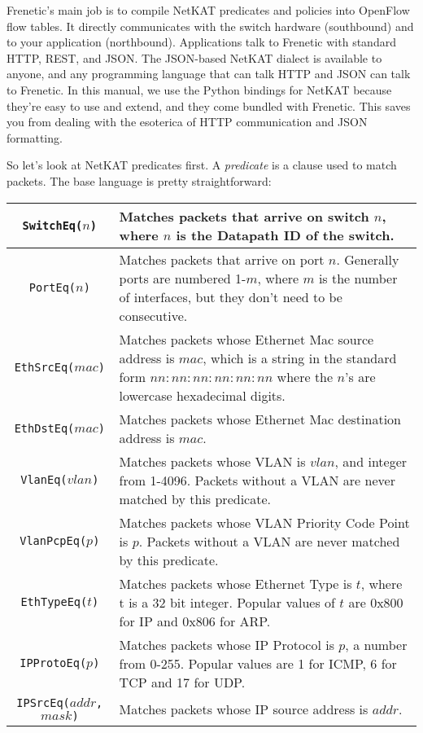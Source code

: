 Frenetic's main job is to compile NetKAT predicates and policies into OpenFlow flow tables.  
It directly communicates with the switch hardware (southbound) and to your application (northbound).
Applications talk to Frenetic with standard HTTP, REST, and JSON.
The JSON-based NetKAT dialect is available to anyone, and any programming language that can talk HTTP and 
JSON can talk to Frenetic.
In this manual, we use the Python bindings for NetKAT because they're easy to use and extend, and they
come bundled with Frenetic.  
This saves you from dealing with the esoterica of HTTP communication and JSON formatting.  

So let's look at NetKAT predicates first.  
A \textit{predicate} is a clause used to match packets.
The base language is pretty straightforward:

\bigskip
\begin{tabularx}{\linewidth}{|c|X|}
\hline\hline
\texttt{SwitchEq($n$)} & Matches packets that arrive on switch $n$, where $n$ is the Datapath ID of the switch.  
\\ \hline
\texttt{PortEq($n$)} & Matches packets that arrive on port $n$.  Generally ports are numbered 1-$m$, where $m$ is the
number of interfaces, but they don't need to be consecutive.  
\\ \hline
\texttt{EthSrcEq($mac$)} & Matches packets whose Ethernet Mac source address is $mac$, which is a string in the standard form $nn:nn:nn:nn:nn:nn$ where the $n$'s are lowercase hexadecimal digits.
\\ \hline
\texttt{EthDstEq($mac$)} & Matches packets whose Ethernet Mac destination address is $mac$.
\\ \hline
\texttt{VlanEq($vlan$)} & Matches packets whose VLAN is $vlan$, and integer from 1-4096.  Packets without a VLAN are never matched by this predicate.
\\ \hline
\texttt{VlanPcpEq($p$)} & Matches packets whose VLAN Priority Code Point is $p$.  Packets without a VLAN are never matched by this predicate.
\\ \hline
\texttt{EthTypeEq($t$)} & Matches packets whose Ethernet Type is $t$, where t is a 32 bit integer.  Popular values of $t$ are 0x800 for IP and 0x806 for ARP.  
\\ \hline
\texttt{IPProtoEq($p$)} & Matches packets whose IP Protocol is $p$, a number from 0-255.  
Popular values are 1 for ICMP, 6 for TCP and 17 for UDP.  
\\ \hline
\texttt{IPSrcEq($addr$, $mask$)} & Matches packets whose IP source address is $addr$.  

\end{tabularx}
